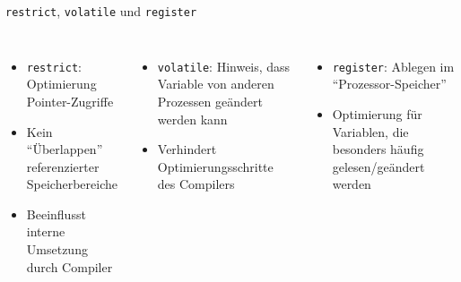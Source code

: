 \begin{frame}[fragile]{\texttt{restrict}, \texttt{volatile} und \texttt{register}}
%
\begin{columns}[T]
\begin{itemize}
\item \texttt{restrict}: Optimierung Pointer-Zugriffe
\item Kein \enquote{Überlappen} referenzierter Speicherbereiche
\item Beeinflusst interne Umsetzung durch Compiler
\end{itemize}
%
\begin{itemize}
\item \texttt{volatile}: Hinweis, dass Variable von anderen Prozessen geändert werden kann
\item Verhindert Optimierungsschritte des Compilers
\end{itemize}
%
\begin{itemize}
\item \texttt{register}: Ablegen im \enquote{Prozessor-Speicher}
\item Optimierung für Variablen, die besonders häufig gelesen/geändert werden
\end{itemize}
\end{columns}
%
\end{frame}


